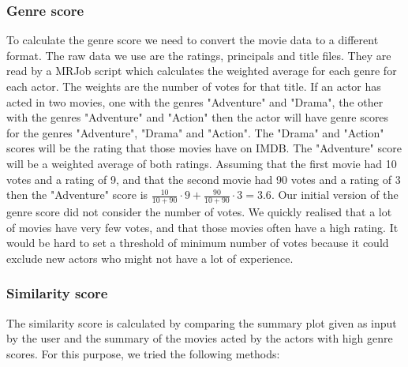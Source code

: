 \subsubsection{Genre score}
To calculate the genre score we need to convert the movie data to a different format. The raw data we use are the ratings, principals and title files. They are read by a MRJob script which calculates the weighted average for each genre for each actor. The weights are the number of votes for that title. If an actor has acted in two movies, one with the genres "Adventure" and "Drama", the other with the genres "Adventure" and "Action" then the actor will have genre scores for the genres "Adventure", "Drama" and "Action". The "Drama" and "Action" scores will be the rating that those movies have on IMDB. The "Adventure" score will be a weighted average of both ratings. Assuming that the first movie had 10 votes and a rating of 9, and that the second movie had 90 votes and a rating of 3 then the "Adventure" score is $\frac{10}{10+90}\cdot9+\frac{90}{10+90}\cdot3=3.6$. Our initial version of the genre score did not consider the number of votes. We quickly realised that a lot of movies have very few votes, and that those movies often have a high rating. It would be hard to set a threshold of minimum number of votes because it could exclude new actors who might not have a lot of experience. 

\subsubsection{Similarity score}
The similarity score is calculated by comparing the summary plot given as input by the user and the summary of the movies acted by the actors with high genre scores. For this purpose, we tried the following methods: 

